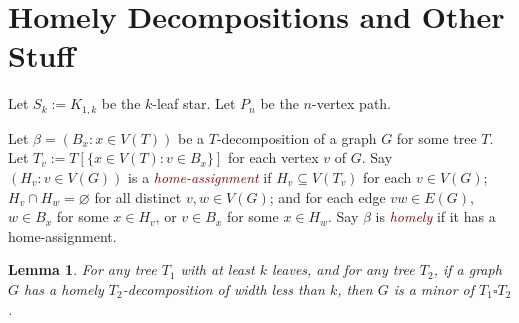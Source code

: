 \documentclass[lotsofwhite]{patmorin}
\newcommand{\defn}[1]{\textcolor{Maroon}{\emph{#1}}}
\renewcommand{\emptyset}{\varnothing}
\theoremstyle{plain}
\newtheorem{lem}[thm]{Lemma}
\theoremstyle{definition}
\begin{document}
{\fontsize{10pt}{11pt}\selectfont

}


\appendix

\section{Homely Decompositions and Other Stuff}

Let $S_k:= K_{1,k}$ be the $k$-leaf star.
Let $P_n$ be the $n$-vertex path.


Let $\beta=(B_x:x\in V(T))$ be a $T$-decomposition
of a graph $G$ for some tree $T$. Let  $T_v:=T[\{x\in V(T):v\in B_x\}]$ for each vertex $v$ of $G$. Say $(H_v:v\in V(G))$ is a \defn{home-assignment} if
$H_v\subseteq V(T_v)$ for each $v\in V(G)$;
$H_v\cap H_w=\emptyset$ for all distinct $v,w\in V(G)$; and for each edge $vw\in E(G)$, $w\in B_x$ for some $x\in H_v$, or $v\in B_x$ for some $x\in H_w$. Say $\beta$ is \defn{homely} if it has a home-assignment.

\begin{lem}
\label{Homely}
For any tree $T_1$ with at least $k$ leaves, and for any tree $T_2$, if a graph $G$ has a homely $T_2$-decomposition of width less than $k$, then $G$ is a minor of $T_1 \square T_2$.
\end{lem}
\end{document}
